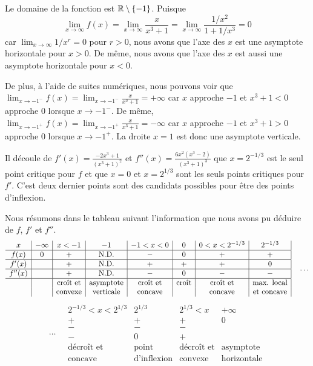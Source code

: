 {  Le domaine de la fonction est $\mathbb{R}\setminus \{-1\}$.
Puisque
\[
\lim_{x\to \infty} f(x) = \lim_{x\to \infty} \frac{x}{x^3+1}
= \lim_{x\to \infty} \frac{1/x^2}{1+1/x^3} = 0
\]
car $\displaystyle \lim_{x\to \infty} 1/x^r = 0$ pour $r>0$, nous avons que
l'axe des $x$ est une asymptote horizontale pour $x>0$.  De même, nous
avons que l'axe des $x$ est aussi une asymptote horizontale pour $x<0$.

De plus, à l'aide de suites numériques, nous pouvons voir que
$\displaystyle \lim_{x\to -1^-} f(x)
= \lim_{x\to -1^-} \frac{x}{x^3+1} = +\infty$
car $x$ approche $-1$ et $x^3+1<0$ approche $0$ lorsque $x \to -1^-$.
De même, $\displaystyle \lim_{x\to -1^+} f(x)
= \lim_{x\to -1^+} \frac{x}{x^3+1} = -\infty$
car $x$ approche $-1$ et $x^3+1>0$ approche $0$ lorsque $x \to -1^+$.
La droite $x=1$ est donc une asymptote verticale.

Il découle de $\displaystyle f'(x) = \frac{-2x^3+1}{(x^3+1)^2}$ et
$\displaystyle f''(x) = \frac{6x^2(x^3-2)}{(x^3+1)^3}$ que
$x = 2^{-1/3}$ est le seul point critique pour $f$ et que
$x=0$ et $x = 2^{1/3}$ sont les seuls points critiques pour
$f'$.  C'est deux dernier points sont des candidats possibles pour
être des points d'inflexion.

Nous résumons dans le tableau suivant l'information que nous avons pu
déduire de $f$, $f'$ et $f''$.
\[
\begin{array}{c|c|c|c|c|c|c|c|}
x & -\infty & x< -1&-1& -1 <x< 0 & 0 & 0 <x< 2^{-1/3} & 2^{-1/3} \\
\hline
f(x) & 0 &+ & \text{N.D.} & - & 0 &+ & + \\
\hline
f'(x) & & + & \text{N.D.} & + & + & + & 0  \\
\hline
f''(x) & & + & \text{N.D.} & - & 0 & - & - \\
\hline
& & \text{croît et} & \text{asymptote} & \text{croît et} & \text{croît}
& \text{croît et} & \text{max. local}  \\
& & \text{convexe} & \text{verticale} & \text{concave} & &
\text{concave} & \text{et concave}
\end{array} \quad \ldots
\]
\[
\ldots \quad \begin{array}{|c|c|c|c}
2^{-1/3} <x< 2^{1/3} & 2^{1/3}& 2^{1/3} <x & +\infty\\
\hline
 + & + & + & 0\\
\hline
 - & - & - & \\
\hline
 - & 0 & + & \\
\hline
\text{décroît et} & \text{point} & \text{décroît et} & \text{asymptote} \\
\text{concave} & \text{d'inflexion} & \text{convexe} & \text{horizontale}
\end{array}
\]

}
